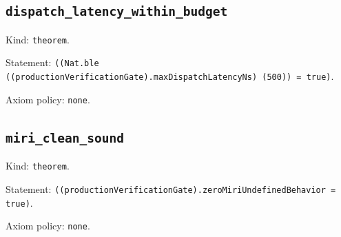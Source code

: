 \documentclass[11pt]{article}
\begin{document}
\subsection*{\texttt{dispatch\_latency\_within\_budget}}
\noindent Kind: \texttt{theorem}.\par
\noindent Statement: \texttt{((Nat.ble ((productionVerificationGate).maxDispatchLatencyNs) (500)) = true)}.\par
\noindent Axiom policy: \texttt{none}.\par
\subsection*{\texttt{miri\_clean\_sound}}
\noindent Kind: \texttt{theorem}.\par
\noindent Statement: \texttt{((productionVerificationGate).zeroMiriUndefinedBehavior = true)}.\par
\noindent Axiom policy: \texttt{none}.\par
\end{document}

